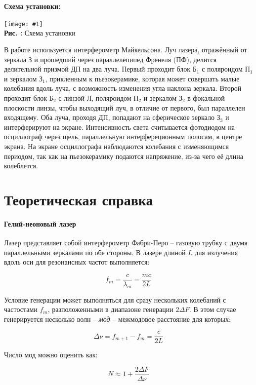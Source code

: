 \documentclass[12pt,a4paper]{article}
\newcounter{picture}
\newcommand{\embed}[3]{\begin{center}
		\texttt{[image: \#1]}
		\\\textbf{Рис. \thepicture:} #3
		\label{pic_\thepicture}
		\addtocounter{picture}{1}
\end{center}}
\begin{document}
	\paragraph*{Схема установки:} \hfill
	
	\embed{PIC_1.png}{0.23}{Схема установки}
	
	В работе используется интерферометр Майкельсона. Луч лазера, отражённый от зеркала З и прошедший через параллелепипед Френеля (ПФ), делится делительной призмой ДП на два луча. Первый проходит блок $\text{Б}_1$ с поляроидом $\text{П}_1$ и зеркалом $\text{З}_1$, прикленным к пьезокерамике, которая может совершать малые колебания вдоль луча, с возможность изменения угла наклона зеркала. Второй проходит блок $\text{Б}_2$ с линзой Л, поляроидом $\text{П}_2$ и зеркалом $\text{З}_2$ в фокальной плоскости линзы, чтобы выходящий луч, в отличие от первого, был параллелен входящему. Оба луча, проходя ДП, попадают на сферическое зеркало $\text{З}_3$ и интерферируют на экране. Интенсивность света считывается фотодиодом на осциллограф через щель, параллельную интерфереционным полосам, в центре экрана. На экране осциллографа наблюдаются колебания с изменяющимся периодом, так как на пьезокерамику подаются напряжение, из-за чего её длина колеблется.
	
	\section{Теоретическая справка}
	
	\paragraph*{Гелий-неоновый лазер} \hfill
	
	Лазер представляет собой интерферометр Фабри-Перо -- газовую трубку с двумя параллельными зеркалами по обе стороны. В лазере длиной $L$ для излучения вдоль оси для резонансных частот выполняется:
	
	$$ f_m = \dfrac{c}{\lambda_m} = \dfrac{mc}{2L} $$

	Условие генерации может выполняться для сразу нескольких колебаний с частостами $f_m$, разположенными в диапазоне генерации $2\Delta F$. В этом случае генерируется несколько волн -- \textit{мод} -- межмодовое расстояние для которых:
	
	$$ \Delta \nu = f_{m+1} - f_m = \dfrac{c}{2L} $$
	
	Число мод можно оценить как:
	
	$$ N \approx 1 + \dfrac{2\Delta F}{\Delta \nu} $$
	
\end{document}

